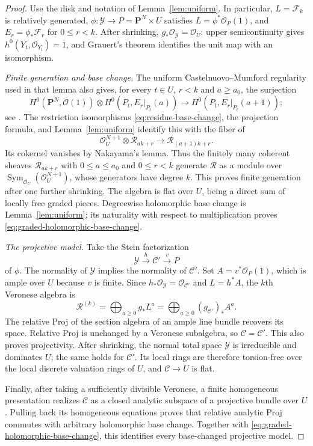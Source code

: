 \documentclass[11pt,a4paper]{article}
\numberwithin{equation}{section}
\theoremstyle{definition}
\theoremstyle{remark}
\newcommand{\PP}{\mathbf P}\newcommand{\HH}{\mathbb H}
\newcommand{\OO}{\mathcal O}\newcommand{\cX}{\mathcal X}
\begin{document}
\begin{proof}
Use the disk and notation of Lemma~\ref{lem:uniform}. In particular,
$L=\mathcal F_k$ is relatively generated,
$\phi:\mathcal Y\to P=\PP^N\times U$ satisfies
$L=\phi^*\OO_P(1)$, and
$E_r=\phi_*\mathcal F_r$ for $0\le r<k$.
After shrinking, $g_*\OO_{\mathcal Y}=\OO_U$: upper
semicontinuity gives $h^0(Y_t,\OO_{Y_t})=1$, and Grauert's theorem
identifies the unit map with an isomorphism.

\emph{Finite generation and base change.}
The uniform Castelnuovo--Mumford regularity used in that lemma also
gives, for every $t\in U$, $r<k$ and $a\ge a_0$, the surjection
\[
 H^0(\PP^N,\OO(1))\otimes H^0(P_t,E_r|_{P_t}(a))
 \longrightarrow H^0(P_t,E_r|_{P_t}(a+1));
\]
see \cite[Lecture~14]{Mumford1966}. The restriction isomorphisms
\eqref{eq:residue-base-change}, the projection formula, and
Lemma~\ref{lem:uniform} identify this with the fiber of
\[
 \OO_U^{N+1}\otimes\mathcal R_{ak+r}
 \longrightarrow\mathcal R_{(a+1)k+r}.
\]
Its cokernel vanishes by Nakayama's lemma. Thus the finitely many
coherent sheaves $\mathcal R_{ak+r}$ with $0\le a\le a_0$ and
$0\le r<k$ generate $\mathcal R$ as a module over
$\operatorname{Sym}_{\OO_U}(\OO_U^{N+1})$, whose generators have
degree $k$. This proves finite generation after one further
shrinking. The algebra is flat over $U$, being a direct sum of
locally free graded pieces. Degreewise holomorphic base change is
Lemma~\ref{lem:uniform}; its naturality with respect to multiplication
proves \eqref{eq:graded-holomorphic-base-change}.

\smallskip\noindent\emph{The projective model.}
Take the Stein factorization
\[
 \mathcal Y\xrightarrow{h}\mathcal C'
 \xrightarrow{v}P
\]
of $\phi$. The normality of $\mathcal Y$ implies the normality of
$\mathcal C'$. Set $A=v^*\OO_P(1)$, which is ample over $U$
because $v$ is finite. Since $h_*\OO_{\mathcal Y}=\OO_{\mathcal C'}$
and $L=h^*A$, the $k$th Veronese algebra is
\[
 \mathcal R^{(k)}
 =\bigoplus_{a\ge0}g_*L^a
 =\bigoplus_{a\ge0}(g_{\mathcal C'})_*A^a.
\]
The relative Proj of the section algebra of an ample line bundle
recovers its space. Relative Proj is unchanged by a Veronese
subalgebra, so $\mathcal C=\mathcal C'$. This also proves projectivity.
After shrinking, the normal total space $\mathcal Y$ is irreducible
and dominates $U$; the same holds for $\mathcal C'$. Its local rings
are therefore torsion-free over the local discrete valuation rings
of $U$, and $\mathcal C\to U$ is flat.

Finally, after taking a sufficiently divisible Veronese, a finite
homogeneous presentation realizes $\mathcal C$ as a closed analytic
subspace of a projective bundle over $U$. Pulling back its homogeneous
equations proves that relative analytic Proj commutes with arbitrary
holomorphic base change. Together with
\eqref{eq:graded-holomorphic-base-change}, this identifies every
base-changed projective model.
\end{proof}
\end{document}
